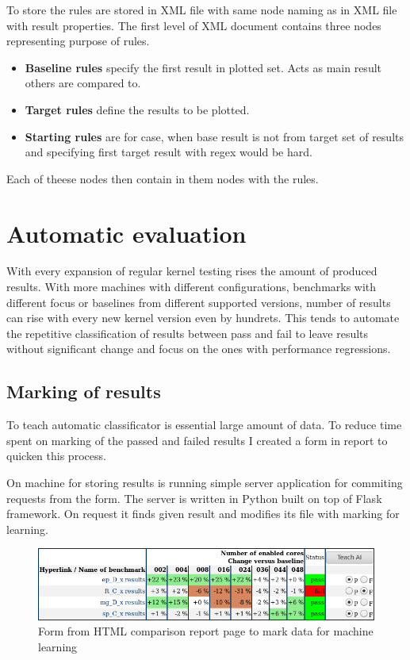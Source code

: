 To store the rules are stored in XML file with same node naming as in XML file
with result properties. The first level of XML document contains three nodes
representing purpose of rules.
\begin{itemize}
  \item \textbf{Baseline rules} specify the first result in plotted set. Acts as
    main result others are compared to.
  \item \textbf{Target rules} define the results to be plotted.
  \item \textbf{Starting rules} are for case, when base result is not from
    target set of results and specifying first target result with regex would be
    hard.
\end{itemize}
Each of theese nodes then contain in them nodes with the rules.


\chapter{Automatic evaluation}
With every expansion of regular kernel testing rises the amount of produced
results. With more machines with different configurations, benchmarks with
different focus or baselines from different supported versions, number of results
can rise with every new kernel version even by hundrets. This tends to automate
the repetitive classification of results between pass and fail to leave results
without significant change and focus on the ones with performance regressions.

\section{Marking of results}
To teach automatic classificator is essential large amount of data. To reduce
time spent on marking of the passed and failed results I created a form in
report to quicken this process.

On machine for storing results is running simple server application for
commiting requests from the form. The server is written in Python built on top
of Flask framework. On request it finds given result and modifies its file with
marking for learning.

\begin{figure}
  \centering
  \includegraphics[width=12cm]{obrazky-figures/teaching_table}
  \caption{Form from HTML comparison report page to mark data for machine learning}
\end{figure}


